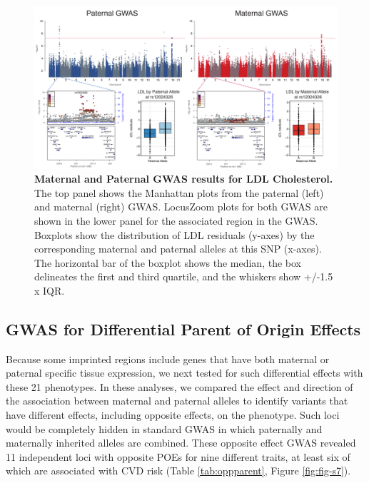 \begin{figure}[!htb]
\centering \includegraphics[width=6in]{img/ch02/fig-02-ldl_matpatgwas.pdf}
\caption[Maternal and Paternal GWAS results for LDL Cholesterol.]{\textbf{Maternal and Paternal GWAS results for LDL Cholesterol.}  The top panel shows the Manhattan plots from the paternal (left) and maternal (right) GWAS. LocusZoom plots for both GWAS are shown in the lower panel for the associated region in the GWAS. Boxplots show the distribution of LDL residuals (y-axes) by the corresponding maternal and paternal alleles at this SNP (x-axes). The horizontal bar of the boxplot shows the median, the box delineates the first and third quartile, and the whiskers show +/-1.5 x IQR.}
\label{fig:ldl_mpgwas}
\end{figure}


\subsection{GWAS for Differential Parent of Origin Effects}\label{GWAS for Differential Parent of Origin Effects}

Because some imprinted regions include genes that have both maternal or paternal specific tissue expression, we next tested for such differential effects with these 21 phenotypes. In these analyses, we compared the effect and direction of the association between maternal and paternal alleles to identify variants that have different effects, including opposite effects, on the phenotype. Such loci would be completely hidden in standard GWAS in which paternally and maternally inherited alleles are combined. These opposite effect GWAS revealed 11 independent loci with opposite POEs for nine different traits, at least six of which are associated with CVD risk (Table \ref{tab:oppparent}, Figure \ref{fig:fig-s7}). 


